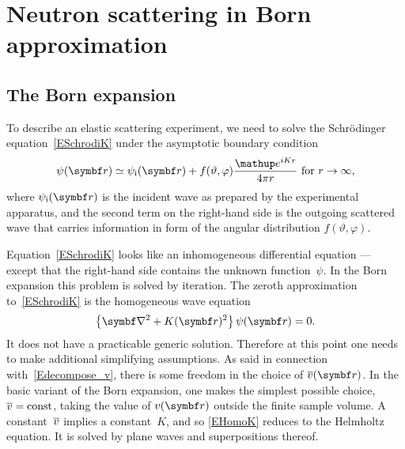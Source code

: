 %
%

\section{Neutron scattering in Born approximation}\label{SBornApprox}

\subsection{The Born expansion}\label{SBornExpans}

%

To describe an elastic scattering experiment,
we need to solve the Schrödinger equation~\cref{ESchrodiK}
under the asymptotic boundary condition
%
\begin{equation}\label{Escabouco}
  \psi(\r)
  \simeq \psi_\ti(\r) + f(\vartheta,\varphi)\frac{\e^{iKr}}{4\pi r}
  \text{~for~}r\to\infty,
\end{equation}
%
%
%
where $\psi_\ti(\r)$ is the incident wave
as prepared by the experimental apparatus,
and the second term on the right-hand side is
the outgoing scattered wave
that carries information in form of the angular distribution
$f(\vartheta,\varphi)$.

Equation~\cref{ESchrodiK} looks
like an inhomogeneous differential equation ---
except that the right-hand side contains the unknown function~$\psi$.
In the Born expansion this problem is solved by iteration.
The zeroth approximation to~\cref{ESchrodiK} is the homogeneous wave equation
\begin{equation}\label{EHomoK}
  \left\{\Nabla^2+K(\r)^2\right\}\psi(\r) = 0.
\end{equation}
It does not have a practicable generic solution.
Therefore at this point one needs to make additional simplifying assumptions.
As said in connection with~\cref{Edecompose_v},
there is some freedom in the choice of $\mv(\r)$.
In the basic variant of the Born expansion,
one makes the simplest possible choice, $\overline{v}=\text{const}$,
taking the value of $v(\r)$ outside the finite sample volume.
A constant~$\overline{v}$ implies a constant~$K$,
and so \cref{EHomoK} reduces to the Helmholtz equation.
%
%
It is solved by plane waves and superpositions thereof.

